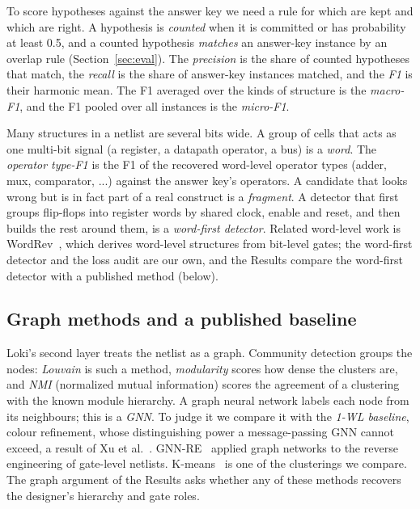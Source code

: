 \documentclass[conference]{IEEEtran}
\begin{document}
To score hypotheses against the answer key we need a rule for which are kept and which are right. A hypothesis is \emph{counted} when it is committed or has probability at least 0.5, and a counted hypothesis \emph{matches} an answer-key instance by an overlap rule (Section~\ref{sec:eval}). %
The \emph{precision} is the share of counted hypotheses that match, the \emph{recall} is the share of answer-key instances matched, and the \emph{F1} is their harmonic mean. %
The F1 averaged over the kinds of structure is the \emph{macro-F1}, and the F1 pooled over all instances is the \emph{micro-F1}. %

Many structures in a netlist are several bits wide. A group of cells that acts as one multi-bit signal
(a register, a datapath operator, a bus) is a \emph{word}. %
The \emph{operator type-F1} is the F1 of the recovered word-level operator types (adder, mux, comparator, ...) %
against the answer key's operators. A candidate that looks wrong but is in fact part of a real construct is a
\emph{fragment}. %
A detector that first groups flip-flops into register words by shared clock, enable and reset, and then builds the
rest around them, is a \emph{word-first detector}. %
Related word-level work is WordRev~\cite{li2013wordrev}, which derives word-level structures from bit-level gates; the word-first detector and the loss audit are our own, and the Results compare the word-first detector with a published method (below).

\subsection{Graph methods and a published baseline}

Loki's second layer treats the netlist as a graph. Community detection groups the nodes: \emph{Louvain} is such a method, %
\emph{modularity} scores how dense the clusters are, and \emph{NMI} (normalized mutual information) scores the
agreement of a clustering with the known module hierarchy. A graph neural network labels each node from its
neighbours; this is a \emph{GNN}. %
To judge it we compare it with the \emph{1-WL baseline}, colour refinement, whose distinguishing power a
message-passing GNN cannot exceed, a result of Xu et al.~\cite{xu2019powerful}. GNN-RE~\cite{alrahis2022gnnre} applied graph networks to the reverse engineering of gate-level netlists. K-means~\cite{kmeans} is one of the clusterings we compare. The graph argument of the Results asks whether any of these methods recovers the designer's hierarchy and gate roles.
\end{document}
